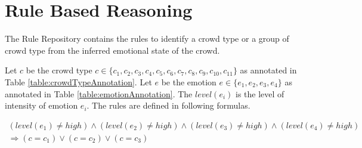 
\section{Rule Based Reasoning}

The Rule Repository contains the rules to identify a crowd type or a group of crowd type from the inferred emotional state of the crowd. 

Let \(c\) be the crowd type \(c \in \{c_1, c_2, c_3, c_4, c_5, c_6, c_7, c_8, c_9, c_{10}, c_{11}\}\) as annotated in Table \ref{table:crowdTypeAnnotation}. Let \(e\) be the emotion \(e \in \{e_1, e_2, e_3, e_4\}\) as annotated in Table \ref{table:emotionAnnotation}. The \(level(e_i)\) is the level of intensity of emotion \(e_i\). The rules are defined in following formulas.

\begin{equation}
\label{eq:rule1}
\begin{split}
	(level(e_1) \neq high) \land (level(e_2) \neq high) \land (level(e_3) \neq high) \land (level(e_4) \neq high) \\
	\Rightarrow (c = c_1) \lor (c = c_2) \lor (c = c_3)
\end{split}
\end{equation}

